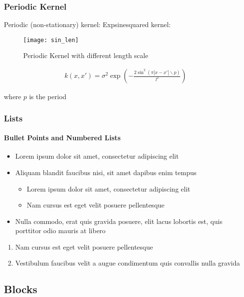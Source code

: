 \documentclass[
	9pt, %
]{beamer}
\begin{document}
\begin{frame}
	\frametitle{Periodic Kernel}
	Periodic (non-stationary) kernel: Expsinesquared kernel:

	\begin{figure}
			\texttt{[image: sin\_len]}
			\caption{Periodic Kernel with different length scale}
	\end{figure}

	\begin{gather*}
    k(x, x') = \sigma^2 \exp(- \frac{2 \sin^2(\pi |x-x'| \backslash p)}{l^2})
	\end{gather*}

	where $p$ is the period
\end{frame}





\begin{frame}
	\frametitle{Lists}
	\framesubtitle{Bullet Points and Numbered Lists} %

	\begin{itemize}
		\item Lorem ipsum dolor sit amet, consectetur adipiscing elit
		\item Aliquam blandit faucibus nisi, sit amet dapibus enim tempus
		\begin{itemize}
			\item Lorem ipsum dolor sit amet, consectetur adipiscing elit
			\item Nam cursus est eget velit posuere pellentesque
		\end{itemize}
		\item Nulla commodo, erat quis gravida posuere, elit lacus lobortis est, quis porttitor odio mauris at libero
	\end{itemize}

	\bigskip %

	\begin{enumerate}
		\item Nam cursus est eget velit posuere pellentesque
		\item Vestibulum faucibus velit a augue condimentum quis convallis nulla gravida
	\end{enumerate}
\end{frame}


\subsection{Blocks}
\end{document}
